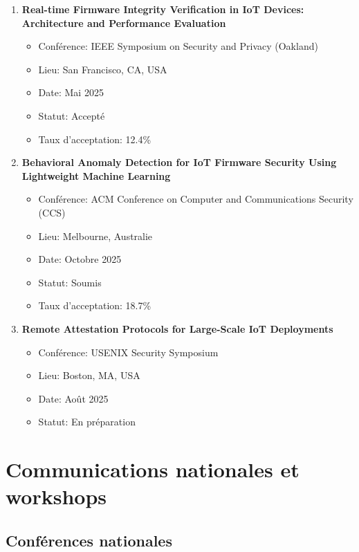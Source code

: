 \begin{enumerate}
    \item \textbf{Real-time Firmware Integrity Verification in IoT Devices: Architecture and Performance Evaluation}
    \begin{itemize}
        \item Conférence: IEEE Symposium on Security and Privacy (Oakland)
        \item Lieu: San Francisco, CA, USA
        \item Date: Mai 2025
        \item Statut: Accepté
        \item Taux d'acceptation: 12.4\%
    \end{itemize}
    
    \item \textbf{Behavioral Anomaly Detection for IoT Firmware Security Using Lightweight Machine Learning}
    \begin{itemize}
        \item Conférence: ACM Conference on Computer and Communications Security (CCS)
        \item Lieu: Melbourne, Australie
        \item Date: Octobre 2025
        \item Statut: Soumis
        \item Taux d'acceptation: 18.7\%
    \end{itemize}
    
    \item \textbf{Remote Attestation Protocols for Large-Scale IoT Deployments}
    \begin{itemize}
        \item Conférence: USENIX Security Symposium
        \item Lieu: Boston, MA, USA
        \item Date: Août 2025
        \item Statut: En préparation
    \end{itemize}
\end{enumerate}

\section{Communications nationales et workshops}

\subsection{Conférences nationales}

